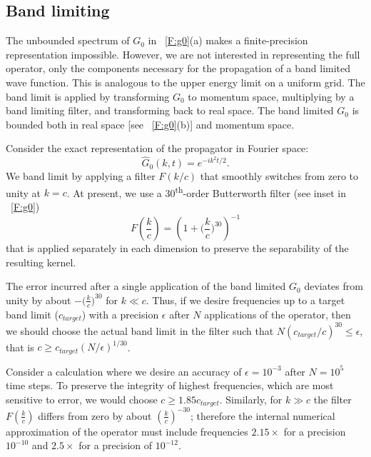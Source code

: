 \documentclass[review,letterpaper]{elsarticle}
\begin{document}
\subsection{Band limiting}
The unbounded spectrum of $G_0$ in \figurename~\ref{F:g0}(a) makes a finite-precision representation impossible.
However, we are not interested in representing the full operator, only the components necessary
for the propagation of a band limited wave function. This is analogous to the upper energy
limit on a uniform grid. The band limit is applied by transforming $G_0$ to momentum
space, multiplying by a band limiting filter, and transforming back to real space.
The band limited $G_0$ is bounded both in real space [see \figurename~\ref{F:g0}(b)] and momentum space.

Consider the exact representation of the propagator in Fourier space:
\begin{equation}
{\hat{G}}_{0}(k,t)=e^{-i k^2t/2}.
\end{equation}
We band limit by applying a filter $F(k/c)$ that smoothly switches from zero to unity at $k=c$.
At present, we use a 30\textsuperscript{th}-order Butterworth filter (see inset in \figurename~\ref{F:g0})
\begin{equation}\label{seq:refText5}
F(\frac k c)=\left(1+\bigg(\frac{k}{c}\bigg)^{30}\right)^{-1}
\end{equation}
that is applied separately in each dimension to preserve the separability
of the resulting kernel.

The error incurred after a single application of the band limited $G_0$ deviates from unity by about $-{(\frac k c})^{30}$ for $k \ll c$.
Thus, if we desire frequencies up to a target band limit ($c_{target}$) with a precision
$\epsilon$ after  $N$ applications of the operator, then we should choose the actual band limit in
the filter such that $N(c_{target}/c)^{30}\le \epsilon$, that is $c\ge c_{target}(N/\epsilon )^{1/30}$.

Consider a calculation where we desire an accuracy of $\epsilon = 10^{-3}$ after $N = 10^5$ time steps.
To preserve the integrity of highest frequencies, which are most sensitive to error, we would choose
$c\ge 1.85c_{target}$. Similarly, for  $k\gg c$ the filter  $F(\frac k c)$ differs from zero by about  $(\frac k c)^{-30}$;
therefore the internal numerical approximation of the operator must include frequencies
 $2.15\times$ for a precision $10^{-10}$ and $2.5\times$ for a precision of $10^{-12}$.
\end{document}
